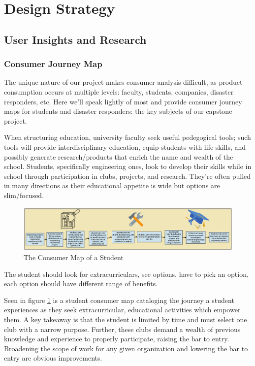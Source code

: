 \documentclass[a4paper, 10pt]{article}
\begin{document}
\pagebreak

\section{Design Strategy}
	\subsection{User Insights and Research} 
		\subsubsection{Consumer Journey Map}
		The unique nature of our project makes consumer analysis difficult, as product consumption occurs at multiple levels: faculty, students, companies, disaster responders, etc. Here we'll speak lightly of most and provide consumer journey maps for students and disaster responders: the key subjects of our capstone project.
		
		When structuring education, university faculty seek useful pedegogical tools; such tools will provide  interdisciplinary education, equip students with life skills, and possibly generate research/products that enrich the name and wealth of the school. Students, specifically engineering ones, look to develop their skills while in school through participation in clubs, projects, and research. They're often pulled in many directions as their educational appetite is wide but options are slim/focused.
		
		\begin{figure} [!h]
			\centering
			\includegraphics[scale=0.4]{Photos/Student Consumer Map}
			\caption{The Consumer Map of a Student}
			\label{consumer_map_student}
		\end{figure}
		
		The student should look for extracurriculars, see options, have to pick an option, each option should have different range of benefits.
		
		Seen in figure \ref{consumer_map_student} is a student consumer map cataloging the journey a student experiences as they seek extracurricular, educational activities which empower them. A key takeaway is that the student is limited by time and must select one club with a narrow purpose. Further, these clubs demand a wealth of previous knowledge and experience to properly participate, raising the bar to entry. Broadening the scope of work for any given organization and lowering the bar to entry are obvious improvements.
		
\end{document}
